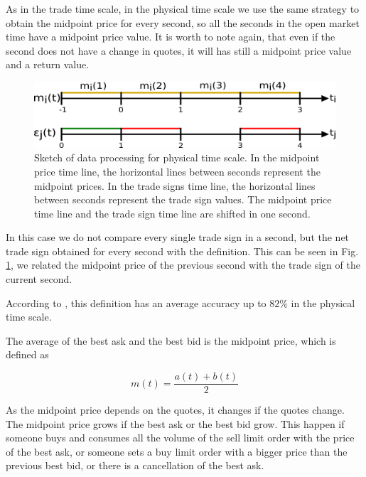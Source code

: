 As in the trade time scale, in the physical time scale we use the same strategy
to obtain the midpoint price for every second, so all the seconds in the open
market time have a midpoint price value. It is worth to note again, that even
if the second does not have a change in quotes, it will has still a midpoint
price value and a return value.

\begin{figure}[htbp]
    \centering
    \includegraphics[width=\columnwidth]
    {figures/02_relation_trades_quotes_time_scale.png}
    \caption{Sketch of data processing for physical time scale. In the midpoint
             price time line, the horizontal lines between seconds represent
             the midpoint prices. In the trade signs time line, the horizontal
             lines between seconds represent the trade sign values. The
             midpoint price time line and the trade sign time line are shifted
             in one second.}
    \label{fig:relation_trades_midpoint_time_scale}
\end{figure}

In this case we do not compare every single trade sign in a second, but the net
trade sign obtained for every second with the definition. This can be seen in
Fig. \ref{fig:relation_trades_midpoint_time_scale}, we related the midpoint
price of the previous second with the trade sign of the current second.

According to \cite{Wang_2016_cross}, this definition has an average
accuracy up to $82\%$ in the physical time scale.


The average of the best ask and the best bid is the midpoint price, which is
defined as \cite{subtle_nature,Bouchaud_2004,large_prices_changes,prop_order_book}

\begin{equation}\label{eq:midpoint_price}
    m\left(t\right)=\frac{a\left(t\right)+b\left(t\right)}{2}
\end{equation}

As the midpoint price depends on the quotes, it changes if the quotes change.
The midpoint price grows if the best ask or the best bid grow. This happen if
someone buys and consumes all the volume of the sell limit order with the price
of the best ask, or someone sets a buy limit order with a bigger price than the
previous best bid, or there is a cancellation of the best ask.

